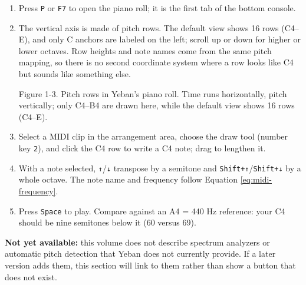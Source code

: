 \begin{enumerate}
  \item Press \texttt{P} or \texttt{F7} to open the piano roll; it is the first tab of the bottom console.
  \item The vertical axis is made of pitch rows. The default view shows 16 rows (C4–E), and only C anchors are labeled on the left; scroll up or down for higher or lower octaves. Row heights and note names come from the same pitch mapping, so there is no second coordinate system where a row looks like C4 but sounds like something else.
  \begin{center}

\small Figure 1-3. Pitch rows in Yeban's piano roll. Time runs horizontally, pitch vertically; only C4--B4 are drawn here, while the default view shows 16 rows (C4--E).
\end{center}
\item Select a MIDI clip in the arrangement area, choose the draw tool (number key \texttt{2}), and click the C4 row to write a C4 note; drag to lengthen it.
  \item With a note selected, \texttt{↑}/\texttt{↓} transpose by a semitone and \texttt{Shift+↑}/\texttt{Shift+↓} by a whole octave. The note name and frequency follow Equation \eqref{eq:midi-frequency}.
  \item Press \texttt{Space} to play. Compare against an A4 = 440 Hz reference: your C4 should be nine semitones below it (60 versus 69).
\end{enumerate}




\textbf{Not yet available:} this volume does not describe spectrum analyzers or automatic pitch detection that Yeban does not currently provide. If a later version adds them, this section will link to them rather than show a button that does not exist.


